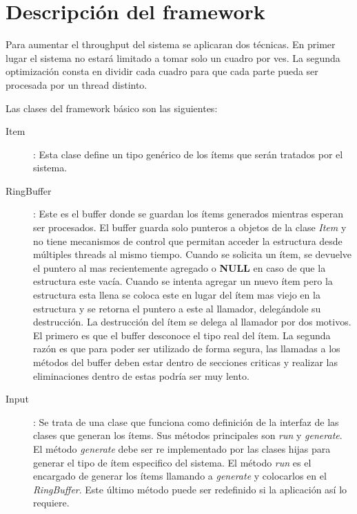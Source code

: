 
\section{Descripción del framework}

Para aumentar el throughput del sistema se aplicaran dos técnicas. En primer
lugar el sistema no estará limitado a tomar solo un cuadro por ves. La segunda
optimización consta en dividir cada cuadro para que cada parte pueda ser
procesada por un thread distinto.

Las clases del framework básico son las siguientes:

\begin{description}

\item[Item]: Esta clase define un tipo genérico de los ítems que serán tratados
	por el sistema.

\item[RingBuffer]: Este es el buffer donde se guardan los ítems generados
	mientras esperan ser procesados. El buffer guarda solo punteros a
	objetos de la clase \emph{Item} y no tiene mecanismos de control que
	permitan acceder la estructura desde múltiples threads al mismo tiempo.
	Cuando se solicita un ítem, se devuelve el puntero al mas recientemente
	agregado o \textbf{NULL} en caso de que la estructura este vacía. Cuando
	se intenta agregar un nuevo ítem pero la estructura esta llena se coloca
	este en lugar del ítem mas viejo en la estructura y se retorna el
	puntero a este al llamador, delegándole su destrucción. La destrucción
	del ítem se delega al llamador por dos motivos. El primero es que el
	buffer desconoce el tipo real del ítem. La segunda razón es que para
	poder ser utilizado de forma segura, las llamadas a los métodos del
	buffer deben estar dentro de secciones criticas y realizar las
	eliminaciones dentro de estas podría ser muy lento.

\item[Input]: Se trata de una clase que funciona como definición de la interfaz
	de las clases que generan los ítems. Sus métodos principales son
	\emph{run} y \emph{generate}. El método \emph{generate} debe ser re
	implementado por las clases hijas para generar el tipo de ítem
	especifico del sistema. El método \emph{run} es el encargado de generar
	los ítems llamando a \emph{generate} y colocarlos en el
	\emph{RingBuffer}. Este último método puede ser redefinido si la
	aplicación así lo requiere.


\end{description}
